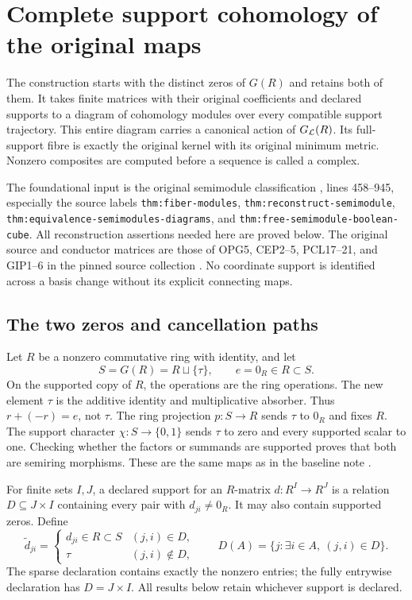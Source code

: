 \section{Complete support cohomology of the original maps}


The construction starts with the distinct zeros of \(G(R)\) and retains
both of them. It takes finite matrices with their original coefficients
and declared supports to a diagram of cohomology modules over every
compatible support trajectory. This entire diagram carries a canonical
action of \(G_{\mathcal L}(R)\). Its full-support fibre is exactly the original
kernel with its original minimum metric. Nonzero composites are computed
before a sequence is called a complex.

The foundational input is the original semimodule classification
\cite{secondary}, lines 458--945, especially the source labels
\texttt{thm:fiber-modules}, \texttt{thm:reconstruct-semimodule},
\texttt{thm:equivalence-semimodules-diagrams}, and
\texttt{thm:free-semimodule-boolean-cube}.
All reconstruction assertions needed here are proved below.
The original source and conductor matrices are those of OPG5, CEP2--5,
PCL17--21, and GIP1--6 in the pinned source collection \cite{programme}.
No coordinate support is identified across a basis change without its
explicit connecting maps.

\subsection{The two zeros and cancellation paths}

Let \(R\) be a nonzero commutative ring with identity, and let
\[
 S=G(R)=R\sqcup\{\tau\},\qquad e=0_R\in R\subset S.
 \tag{SCD1}
\]
On the supported copy of \(R\), the operations are the ring operations.
The new element \(\tau\) is the additive identity and multiplicative
absorber. Thus \(r+(-r)=e\), not \(\tau\).
The ring projection \(p:S\to R\) sends \(\tau\) to \(0_R\) and fixes
\(R\). The support character \(\chi:S\to\{0,1\}\) sends \(\tau\) to zero
and every supported scalar to one. Checking whether the factors or
summands are supported proves that both are semiring morphisms.
These are the same maps as in the baseline note \cite{globalization}.

For finite sets \(I,J\), a declared support for an \(R\)-matrix
\(d:R^I\to R^J\) is a relation \(D\subseteq J\times I\) containing
every pair with \(d_{ji}\ne0_R\). It may also contain supported zeros.
Define
\[
 \widetilde d_{ji}=
 \begin{cases}d_{ji}\in R\subset S &(j,i)\in D,\\
 \tau &(j,i)\notin D,
 \end{cases}
 \qquad
 D(A)=\{j:\exists i\in A,\ (j,i)\in D\}.
 \tag{SCD2}
\]
The sparse declaration contains exactly the nonzero entries;
the fully entrywise declaration has \(D=J\times I\).
All results below retain whichever support is declared.

